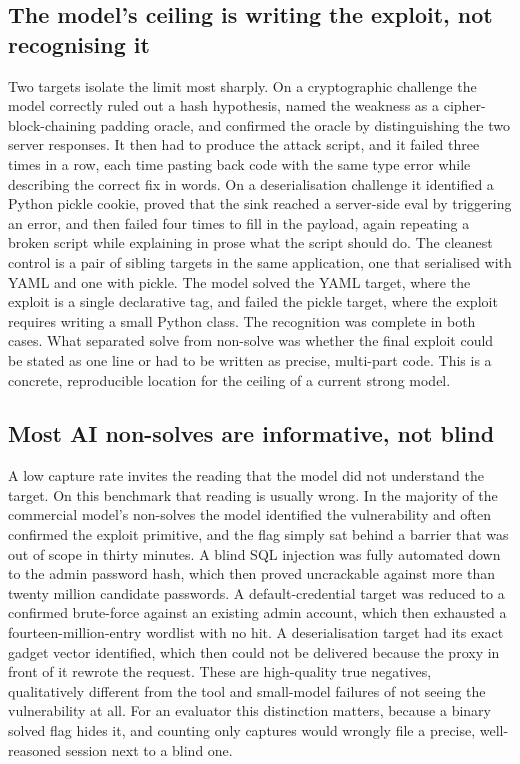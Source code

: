 \documentclass[conference]{IEEEtran}
\begin{document}
\subsection{The model's ceiling is writing the exploit, not recognising it}
\label{sec:disc-ceiling}
Two targets isolate the limit most sharply. On a cryptographic challenge the model correctly ruled out a hash hypothesis, named the weakness as a cipher-block-chaining padding oracle, and confirmed the oracle by distinguishing the two server responses. It then had to produce the attack script, and it failed three times in a row, each time pasting back code with the same type error while describing the correct fix in words. On a deserialisation challenge it identified a Python pickle cookie, proved that the sink reached a server-side eval by triggering an error, and then failed four times to fill in the payload, again repeating a broken script while explaining in prose what the script should do. The cleanest control is a pair of sibling targets in the same application, one that serialised with YAML and one with pickle. The model solved the YAML target, where the exploit is a single declarative tag, and failed the pickle target, where the exploit requires writing a small Python class. The recognition was complete in both cases. What separated solve from non-solve was whether the final exploit could be stated as one line or had to be written as precise, multi-part code. This is a concrete, reproducible location for the ceiling of a current strong model.

\subsection{Most AI non-solves are informative, not blind}
\label{sec:disc-negatives}
A low capture rate invites the reading that the model did not understand the target. On this benchmark that reading is usually wrong. In the majority of the commercial model's non-solves the model identified the vulnerability and often confirmed the exploit primitive, and the flag simply sat behind a barrier that was out of scope in thirty minutes. A blind SQL injection was fully automated down to the admin password hash, which then proved uncrackable against more than twenty million candidate passwords. A default-credential target was reduced to a confirmed brute-force against an existing admin account, which then exhausted a fourteen-million-entry wordlist with no hit. A deserialisation target had its exact gadget vector identified, which then could not be delivered because the proxy in front of it rewrote the request. These are high-quality true negatives, qualitatively different from the tool and small-model failures of not seeing the vulnerability at all. For an evaluator this distinction matters, because a binary solved flag hides it, and counting only captures would wrongly file a precise, well-reasoned session next to a blind one.
\end{document}
